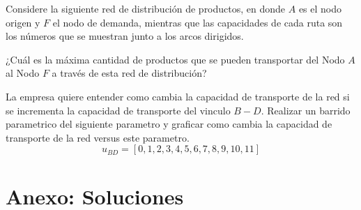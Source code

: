 \documentclass[12pt]{article}
\begin{document}
Considere la siguiente red de distribución de productos, en donde \(A\) es el nodo origen y \(F\) el nodo de demanda, mientras que las capacidades de cada ruta son los números que se muestran junto a los arcos dirigidos.

\vspace{0.3em}
¿Cuál es la máxima cantidad de productos que se pueden transportar del Nodo \(A\) al Nodo \(F\) a través de esta red de distribución?

\begin{center}
\shorthandoff{>}
\shorthandon{>}
\end{center}

La empresa quiere entender como cambia la capacidad de transporte de la red si se incrementa la capacidad de transporte del vinculo \(B-D\). Realizar un barrido parametrico del siguiente parametro y graficar como cambia la capacidad de transporte de la red versus este parametro.
\[
u_{BD} = [0,1,2,3,4,5,6,7,8,9,10,11]
\]






\newpage

\section{Anexo: Soluciones}
\end{document}
